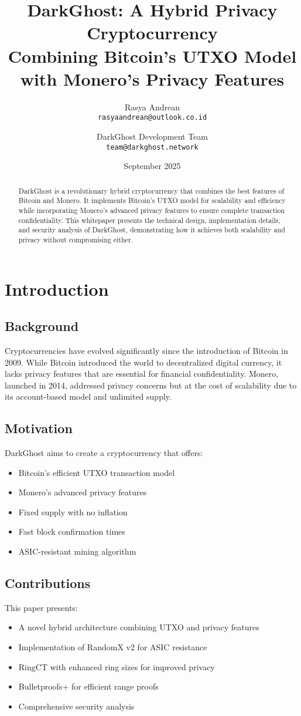 \documentclass[11pt]{article}
\title{DarkGhost: A Hybrid Privacy Cryptocurrency\\
\large Combining Bitcoin's UTXO Model with Monero's Privacy Features}
\author{
Rasya Andrean\\
\texttt{rasyaandrean@outlook.co.id}\\
\and
DarkGhost Development Team\\
\texttt{team@darkghost.network}
}
\date{September 2025}
\begin{document}
\maketitle

\begin{abstract}
DarkGhost is a revolutionary hybrid cryptocurrency that combines the best features of Bitcoin and Monero. It implements Bitcoin's UTXO model for scalability and efficiency while incorporating Monero's advanced privacy features to ensure complete transaction confidentiality. This whitepaper presents the technical design, implementation details, and security analysis of DarkGhost, demonstrating how it achieves both scalability and privacy without compromising either.
\end{abstract}

\tableofcontents
\newpage

\section{Introduction}
\subsection{Background}
Cryptocurrencies have evolved significantly since the introduction of Bitcoin in 2009. While Bitcoin introduced the world to decentralized digital currency, it lacks privacy features that are essential for financial confidentiality. Monero, launched in 2014, addressed privacy concerns but at the cost of scalability due to its account-based model and unlimited supply.

\subsection{Motivation}
DarkGhost aims to create a cryptocurrency that offers:
\begin{itemize}
    \item Bitcoin's efficient UTXO transaction model
    \item Monero's advanced privacy features
    \item Fixed supply with no inflation
    \item Fast block confirmation times
    \item ASIC-resistant mining algorithm
\end{itemize}

\subsection{Contributions}
This paper presents:
\begin{itemize}
    \item A novel hybrid architecture combining UTXO and privacy features
    \item Implementation of RandomX v2 for ASIC resistance
    \item RingCT with enhanced ring sizes for improved privacy
    \item Bulletproofs+ for efficient range proofs
    \item Comprehensive security analysis
\end{itemize}
\end{document}
